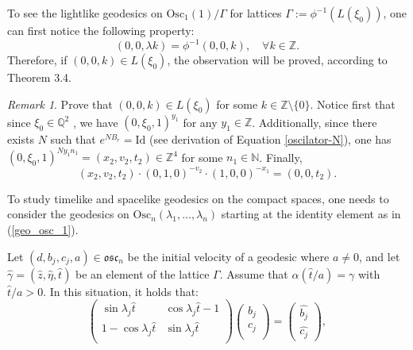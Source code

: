 \documentclass[12pt]{amsart}
\theoremstyle{plain}
\theoremstyle{definition}
\theoremstyle{remark}
\newtheorem{rem}{Remark}
\begin{document}
To see the lightlike geodesics on \( \text{Osc}_1(1)/\Gamma \) for lattices \( \Gamma := \phi^{-1}(L(\xi_0)) \), one can first notice the following property:
\[
(0,0,\lambda k) = \phi^{-1}(0,0,k), \quad \forall k \in \mathbb{Z}.
\]
Therefore, if \( (0,0,k) \in L(\xi_0) \), the observation will be proved, according to Theorem 3.4.

\begin{rem}
    Prove that \( (0,0,k) \in L(\xi_0) \) for some \( k \in \mathbb{Z} \setminus \{ 0 \} \). Notice first that since \( \xi_0 \in \mathbb{Q}^2 \) \cite{MF}, we have \( (0, \xi_0, 1)^{y_1} \) for any \( y_1 \in \mathbb{Z} \). Additionally, since there exists \( N \) such that \( e^{N B_r} = \text{Id} \) (see derivation of Equation \eqref{oscilator-N}), one has \( (0, \xi_0, 1)^{N y_1 n_1} = (x_2, v_2, t_2) \in \mathbb{Z}^4 \) for some \( n_1 \in \mathbb{N} \). Finally,
    \[
    (x_2, v_2, t_2) \cdot (0, 1, 0)^{-v_2} \cdot (1, 0, 0)^{-x_1} = (0,0,t_2).
    \]
\end{rem}

To study timelike and spacelike geodesics on the compact spaces, one needs to consider the geodesics on \( \text{Osc}_n(\lambda_1, \ldots, \lambda_n) \) starting at the identity element as in (\ref{geo_osc_1}).

Let \( (d, b_j, c_j, a) \in \mathfrak{osc}_n \) be the initial velocity of a geodesic where \( a \neq 0 \), and let \( \hat{\gamma} = (\hat{z}, \hat{\eta}, \hat{t}) \) be an element of the lattice \( \Gamma \). Assume that \( \alpha(\hat{t}/a) = \gamma \) with \( \hat{t}/a > 0 \). In this situation, it holds that:
\begin{equation}\label{oscilador_geos_1}
    \left( \begin{matrix}
        \sin{\lambda_j \hat{t}} & \cos{\lambda_j \hat{t}} -1 \\
        1 - \cos{\lambda_j \hat{t}} & \sin{\lambda_j \hat{t}} \\
    \end{matrix} \right)
    \left( \begin{matrix}
        b_j \\
        c_j \\
    \end{matrix} \right) =
    \left( \begin{matrix}
        \hat{b_j} \\
        \hat{c_j}
    \end{matrix} \right),
\end{equation}
\end{document}
